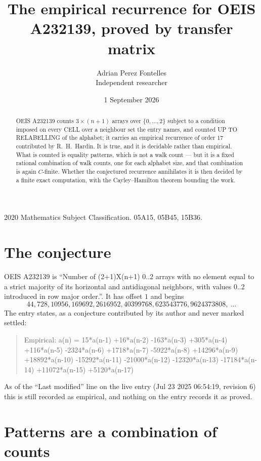 \documentclass[11pt,a4paper]{article}
\title{The empirical recurrence for OEIS A232139, proved by transfer matrix}
\author{Adrian Perez Fontelles\\ \small Independent researcher}
\date{1 September 2026}
\theoremstyle{plain}
\theoremstyle{definition}
\begin{document}
\maketitle

\begin{abstract}
OEIS A232139 counts $3\times(n+1)$ arrays over $\{0,\dots,2\}$ subject to a condition imposed on
every CELL over a neighbour set the entry names, and counted UP TO RELABELLING of the
alphabet; it carries an empirical recurrence of order $17$ contributed by
R.~H.~Hardin. It is true, and it is decidable rather than empirical. What is counted is
equality patterns, which is not a walk count --- but it is a fixed rational combination of
walk counts, one for each alphabet size, and that combination is again $C$-finite. Whether the
conjectured recurrence annihilates it is then decided by a finite exact computation, with the
Cayley--Hamilton theorem bounding the work.
\end{abstract}

\noindent\small 2020 Mathematics Subject Classification. 05A15, 05B45, 15B36.\normalsize

\section{The conjecture}

OEIS A232139 is ``Number of (2+1)X(n+1) 0..2 arrays with no element equal to a strict majority of its horizontal and antidiagonal neighbors, with values 0..2 introduced in row major order.''. It has offset $1$ and begins
\[
44, 728, 10956, 169692, 2616952, 40399768, 623543776, 9624373808,\ \dots
\]
The entry states, as a conjecture contributed by its author and never marked settled:
\begin{quote}
Empirical: a(n) = 15*a(n-1) +16*a(n-2) -163*a(n-3) +305*a(n-4) +116*a(n-5) -2324*a(n-6) +1718*a(n-7) -5922*a(n-8) +14296*a(n-9) +18892*a(n-10) -15292*a(n-11) -21000*a(n-12) -12320*a(n-13) -17184*a(n-14) +11072*a(n-15) +5120*a(n-17)
\end{quote}
As of the ``Last modified'' line on the live entry (Jul 23 2025 06:54:19, revision 6) this is still
recorded as empirical, and nothing on the entry records it as proved.

\section{Patterns are a combination of counts}
\end{document}
